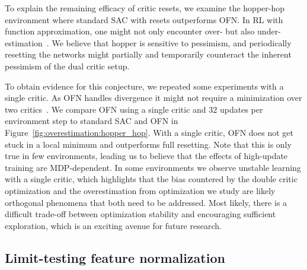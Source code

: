 To explain the remaining efficacy of critic resets, we examine the hopper-hop environment where standard SAC with resets outperforms OFN. 
In RL with function approximation, one might not only encounter over- but also under-estimation~\parencite{wu2020reducing, lan2020maxmin, saglam2021estimation}.
We believe that hopper  is sensitive to pessimism, and periodically resetting the networks might partially and temporarily counteract the inherent pessimism of the dual critic setup.

To obtain evidence for this conjecture, we repeated some experiments with a single critic. As OFN handles divergence it might not require a minimization over two critics~\parencite{fujimoto2018addressing}. We compare OFN using a single critic and $32$ updates per environment step to standard SAC and OFN in Figure~\ref{fig:overestimation:hopper_hop}. With a single critic, OFN does not get stuck in a local minimum and outperforms full resetting. Note that this is only true in few environments, leading us to believe that the effects of high-update training are MDP-dependent.
In some environments we observe unstable learning with a single critic, which highlights that the bias countered by the double critic optimization and the overestimation from optimization we study are likely orthogonal phenomena that both need to be addressed.
Most likely, there is a difficult trade-off between optimization stability and encouraging sufficient exploration, which is an exciting avenue for future research.

\subsection{Limit-testing feature normalization}

